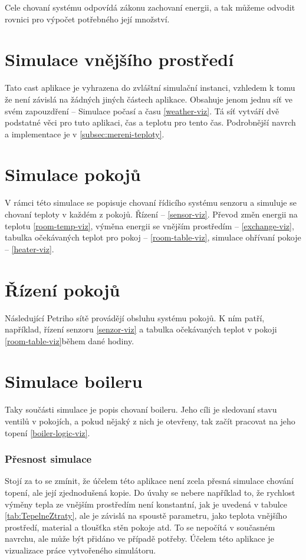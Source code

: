 Cele chovaní systému odpovídá zákonu zachovaní energii, a tak můžeme odvodit rovnici pro výpočet potřebného její množství.

\section{Simulace vnějšího prostředí}
Tato cast aplikace je vyhrazena do zvláštní simulační instanci, vzhledem k tomu že není závislá na žádných jiných částech aplikace. Obsahuje jenom jednu síť ve svém zapouzdření -- Simulace počasí a času \ref{weather-viz}. Tá síť vytváří dvě podstatné věci pro tuto aplikaci, čas a teplotu pro tento čas. Podrobnější navrch a implementace je v \ref{subsec:mereni-teploty}.

\section{Simulace pokojů}

V rámci této simulace se popisuje chovaní řídicího systému senzoru a simuluje se chovaní teploty v každém z pokojů. Řízení -- \ref{sensor-viz}. Převod změn energii na teplotu \ref{room-temp-viz}, výměna energii se vnějším prostředím -- \ref{exchange-viz}, tabulka očekávaných teplot pro pokoj -- \ref{room-table-viz}, simulace ohřívaní pokoje -- \ref{heater-viz}. 

\section{Řízení pokojů}

Následující Petriho sítě provádějí obsluhu systému pokojů. K ním patří, například, řízení senzoru \ref{senzor-viz} a tabulka očekávaných teplot v pokoji \ref{room-table-viz}během dané hodiny.

\section{Simulace boileru}

Taky součásti simulace je popis chovaní boileru. Jeho cíli je sledovaní stavu ventilů v pokojích, a pokud nějaký z nich je otevřeny, tak začít pracovat na jeho topení \ref{boiler-logic-viz}.

\subsubsection{Přesnost simulace}

Stojí za to se zmínit, že účelem této aplikace není zcela přesná simulace chování topení, ale její zjednodušená kopie. Do úvahy se nebere například to, že rychlost výměny tepla ze vnějším prostředím není konstantní, jak je uvedená v tabulce \ref{tab:TepelneZtraty}, ale je závislá na spoustě parametru, jako teplota vnějšího prostředí, material a tloušťka stěn pokoje atd. To se nepočítá v současném navrchu, ale může být přidáno ve případě potřeby. Účelem této aplikace je vizualizace práce vytvořeného simulátoru.

